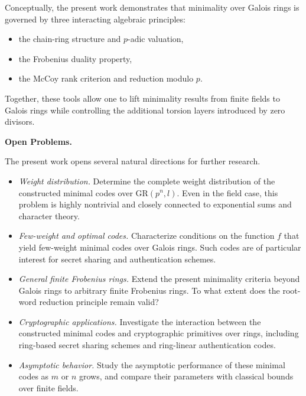 \documentclass[10pt]{article}
\theoremstyle{definition}
\begin{document}
\medskip

Conceptually, the present work demonstrates that minimality over Galois rings is governed by three interacting algebraic principles:

\begin{itemize}
\item the chain-ring structure and $p$-adic valuation,
\item the Frobenius duality property,
\item the McCoy rank criterion and reduction modulo $p$.
\end{itemize}

Together, these tools allow one to lift minimality results from finite fields to Galois rings while controlling the additional torsion layers introduced by zero divisors.

\medskip

\noindent
\textbf{Open Problems.}

The present work opens several natural directions for further research.

\begin{itemize}
\item[(1)] \emph{Weight distribution.}
Determine the complete weight distribution of the constructed minimal codes over $\mathrm{GR}(p^n,l)$.
Even in the field case, this problem is highly nontrivial and closely connected to exponential sums and character theory.

\item[(2)] \emph{Few-weight and optimal codes.}
Characterize conditions on the function $f$ that yield few-weight minimal codes over Galois rings.
Such codes are of particular interest for secret sharing and authentication schemes.

\item[(3)] \emph{General finite Frobenius rings.}
Extend the present minimality criteria beyond Galois rings to arbitrary finite Frobenius rings.
To what extent does the root-word reduction principle remain valid?

\item[(4)] \emph{Cryptographic applications.}
Investigate the interaction between the constructed minimal codes and cryptographic primitives over rings, including ring-based secret sharing schemes and ring-linear authentication codes.

\item[(5)] \emph{Asymptotic behavior.}
Study the asymptotic performance of these minimal codes as $m$ or $n$ grows, and compare their parameters with classical bounds over finite fields.
\end{itemize}
\end{document}
